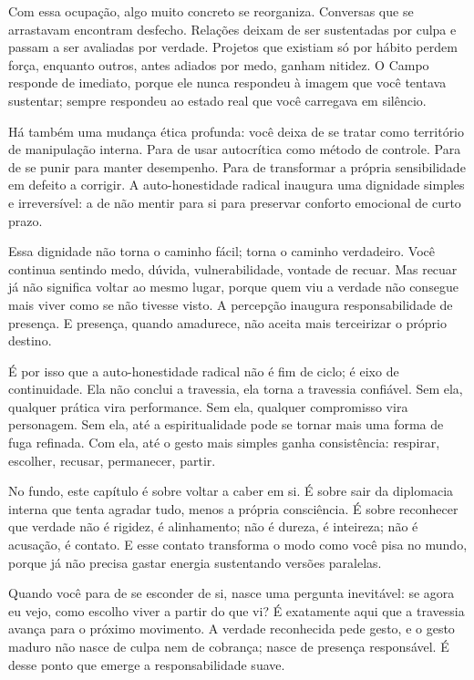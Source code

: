 \documentclass[12pt]{book}
\begin{document}
Com essa ocupação, algo muito concreto se reorganiza. Conversas que se arrastavam encontram desfecho. Relações deixam de ser sustentadas por culpa e passam a ser avaliadas por verdade. Projetos que existiam só por hábito perdem força, enquanto outros, antes adiados por medo, ganham nitidez. O Campo responde de imediato, porque ele nunca respondeu à imagem que você tentava sustentar; sempre respondeu ao estado real que você carregava em silêncio.

Há também uma mudança ética profunda: você deixa de se tratar como território de manipulação interna. Para de usar autocrítica como método de controle. Para de se punir para manter desempenho. Para de transformar a própria sensibilidade em defeito a corrigir. A auto-honestidade radical inaugura uma dignidade simples e irreversível: a de não mentir para si para preservar conforto emocional de curto prazo.

Essa dignidade não torna o caminho fácil; torna o caminho verdadeiro. Você continua sentindo medo, dúvida, vulnerabilidade, vontade de recuar. Mas recuar já não significa voltar ao mesmo lugar, porque quem viu a verdade não consegue mais viver como se não tivesse visto. A percepção inaugura responsabilidade de presença. E presença, quando amadurece, não aceita mais terceirizar o próprio destino.

É por isso que a auto-honestidade radical não é fim de ciclo; é eixo de continuidade. Ela não conclui a travessia, ela torna a travessia confiável. Sem ela, qualquer prática vira performance. Sem ela, qualquer compromisso vira personagem. Sem ela, até a espiritualidade pode se tornar mais uma forma de fuga refinada. Com ela, até o gesto mais simples ganha consistência: respirar, escolher, recusar, permanecer, partir.

No fundo, este capítulo é sobre voltar a caber em si. É sobre sair da diplomacia interna que tenta agradar tudo, menos a própria consciência. É sobre reconhecer que verdade não é rigidez, é alinhamento; não é dureza, é inteireza; não é acusação, é contato. E esse contato transforma o modo como você pisa no mundo, porque já não precisa gastar energia sustentando versões paralelas.

Quando você para de se esconder de si, nasce uma pergunta inevitável: se agora eu vejo, como escolho viver a partir do que vi? É exatamente aqui que a travessia avança para o próximo movimento. A verdade reconhecida pede gesto, e o gesto maduro não nasce de culpa nem de cobrança; nasce de presença responsável. É desse ponto que emerge a responsabilidade suave.
\end{document}
